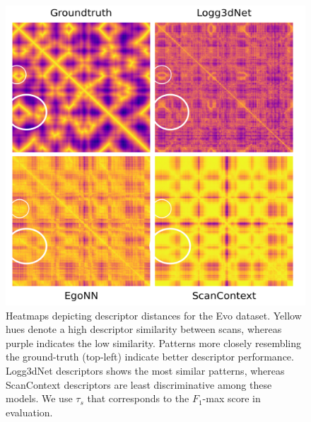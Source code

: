 \begin{figure}[t]
  \centering
  \includegraphics[width=0.90\linewidth]{pics/exp_1.2_heatmap_evo12_plasma_edit}
  \caption{Heatmaps depicting descriptor distances for the Evo dataset. Yellow hues denote a high descriptor similarity between scans, whereas purple indicates the low similarity. Patterns more closely resembling the ground-truth (top-left) indicate better descriptor performance. Logg3dNet descriptors shows the most similar patterns, whereas ScanContext descriptors are least discriminative among these models. We use $\tau_{s}$ that corresponds to the $F_1$-max score in evaluation.}
  \label{fig:heatmap_evo12}
\end{figure}



